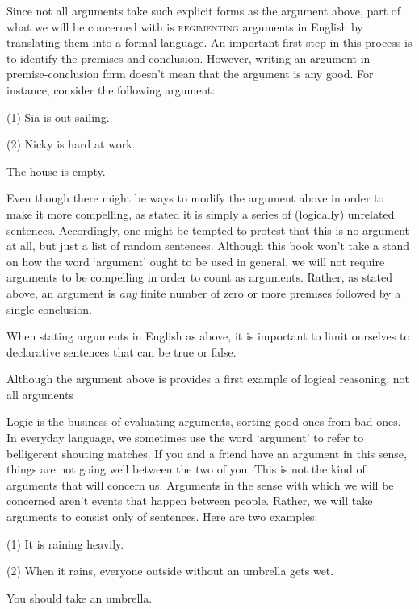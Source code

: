 Since not all arguments take such explicit forms as the argument above, part of what we will be concerned with is \textsc{regimenting} arguments in English by translating them into a formal language.
An important first step in this process is to identify the premises and conclusion.
However, writing an argument in premise-conclusion form doesn't mean that the argument is any good.
For instance, consider the following argument:

\label{argBunk}
\begin{earg}
  \item[(1)] Sia is out sailing.
  \item[(2)] Nicky is hard at work.
  \item[\therefore] The house is empty.
\end{earg}

Even though there might be ways to modify the argument above in order to make it more compelling, as stated it is simply a series of (logically) unrelated sentences.
Accordingly, one might be tempted to protest that this is no argument at all, but just a list of random sentences.
Although this book won't take a stand on how the word `argument' ought to be used in general, we will not require arguments to be compelling in order to count as arguments.
Rather, as stated above, an argument is \textit{any} finite number of zero or more premises followed by a single conclusion.

When stating arguments in English as above, it is important to limit ourselves to declarative sentences that can be true or false.


Although the argument above is provides a first example of logical reasoning, not all arguments

Logic is the business of evaluating arguments, sorting good ones from bad ones.
In everyday language, we sometimes use the word `argument' to refer to belligerent shouting matches.
If you and a friend have an argument in this sense, things are not going well between the two of you.
This is not the kind of arguments that will concern us.
Arguments in the sense with which we will be concerned aren't events that happen between people.
Rather, we will take arguments to consist only of sentences. %
Here are two examples:

\label{argRaining}
\begin{earg}
  \item[(1)] It is raining heavily.
  \item[(2)] When it rains, everyone outside without an umbrella gets wet.
  \item[\therefore] You should take an umbrella.
\end{earg}



